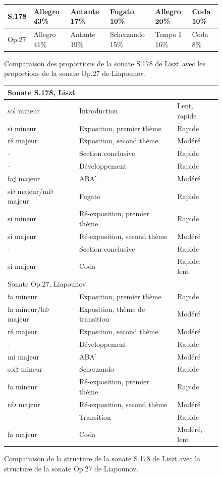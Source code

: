 \begin{figure}[!ht]
  \begin{bigcenter}
    \scalebox{0.925} {
\begin{tabular}{|l||l|l|l|l|l|}
 \hline
S.178 & Allegro 43\% & Antante 17\% & Fugato 10\% & Allegro 20\% & Coda 10\%\\
 \hline
 \hline
Op.27 & Allegro 41\% & Antante 19\% & Scherzando 15\% & Tempo I 16\% & Coda 8\%\\
 \hline
\end{tabular}
    }
  \end{bigcenter}
  \caption{\label{sonate-liapounov-list1} Comparaison des proportions de la sonate S.178 de Liszt avec les proportions de la sonate Op.27 de Liapounov.}
\end{figure}

\begin{figure}[!ht]
  \begin{bigcenter}
    \scalebox{0.925} {
\begin{tabular}{|l|l|l|}
 \hline
\multicolumn{3}{|l|}{Sonate S.178, Liszt}\\
 \hline
sol mineur & Introduction & Lent, rapide\\
si mineur & Exposition, premier thème & Rapide\\
ré majeur & Exposition, second thème & Modéré\\
- & Section conclusive & Rapide\\
- & Développement & Rapide\\
fa$\sharp$ majeur & ABA' & Modéré\\
si$\flat$ majeur/mi$\flat$ majeur & Fugato & Rapide\\
si mineur & Ré-exposition, premier thème & Rapide\\
si majeur & Ré-exposition, second thème & Modéré\\
- & Section conclusive & Rapide\\
si majeur & Coda & Rapide, lent\\
 \hline
 \hline
\multicolumn{3}{|l|}{Sonate Op.27, Liapounov}\\
 \hline
fa mineur & Exposition, premier thème & Rapide\\
fa mineur/la$\flat$ majeur & Exposition, thème de transition & Modéré\\
ré majeur & Exposition, second thème & Modéré \\
- & Développement & Rapide\\
mi majeur & ABA' & Modéré\\
sol$\sharp$ mineur & Scherzando & Rapide\\
fa mineur & Ré-exposition, premier thème & Rapide\\
ré$\flat$ majeur & Ré-exposition, second thème & Modéré\\
- & Transition & Rapide\\
fa majeur & Coda & Modéré, lent\\
 \hline
\end{tabular}
    }
  \end{bigcenter}
  \caption{\label{sonate-liapounov-list2} Comparaison de la structure de la sonate S.178 de Liszt avec la structure de la sonate Op.27 de Liapounov.}
\end{figure}

